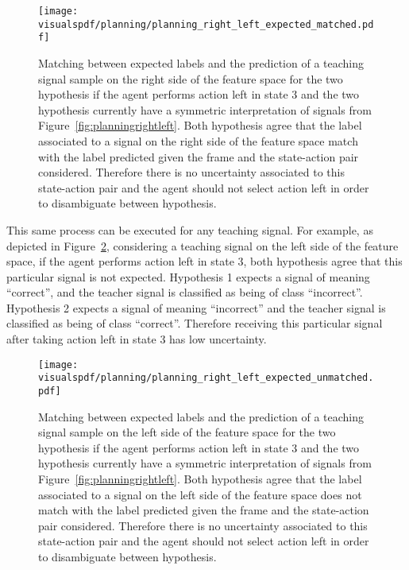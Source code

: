 \begin{figure}[!ht]
  \centering
  \texttt{[image: \\visualspdf/planning/planning\_right\_left\_expected\_matched.pdf]}
  \caption{Matching between expected labels and the prediction of a teaching signal sample on the right side of the feature space for the two hypothesis if the agent performs action left in state 3 and the two hypothesis currently have a symmetric interpretation of signals from Figure~\ref{fig:planningrightleft}. Both hypothesis agree that the label associated to a signal on the right side of the feature space match with the label predicted given the frame and the state-action pair considered. Therefore there is no uncertainty associated to this state-action pair and the agent should not select action left in order to disambiguate between hypothesis.}
  \label{fig:uncertaintymeaningrightleftexpectedleft}
\end{figure}

This same process can be executed for any teaching signal. For example, as depicted in Figure~\ref{fig:uncertaintymeaningrightleftexpectedright}, considering a teaching signal on the left side of the feature space, if the agent performs action left in state 3, both hypothesis agree that this particular signal is not expected. Hypothesis 1 expects a signal of meaning ``correct'', and the teacher signal is classified as being of class ``incorrect''. Hypothesis 2 expects a signal of meaning ``incorrect'' and the teacher signal is classified as being of class ``correct''. Therefore receiving this particular signal after taking action left in state 3 has low uncertainty.

\begin{figure}[!ht]
  \centering
  \texttt{[image: \\visualspdf/planning/planning\_right\_left\_expected\_unmatched.pdf]}
  \caption{Matching between expected labels and the prediction of a teaching signal sample on the left side of the feature space for the two hypothesis if the agent performs action left in state 3 and the two hypothesis currently have a symmetric interpretation of signals from Figure~\ref{fig:planningrightleft}. Both hypothesis agree that the label associated to a signal on the left side of the feature space does not match with the label predicted given the frame and the state-action pair considered. Therefore there is no uncertainty associated to this state-action pair and the agent should not select action left in order to disambiguate between hypothesis.}
  \label{fig:uncertaintymeaningrightleftexpectedright}
\end{figure}


